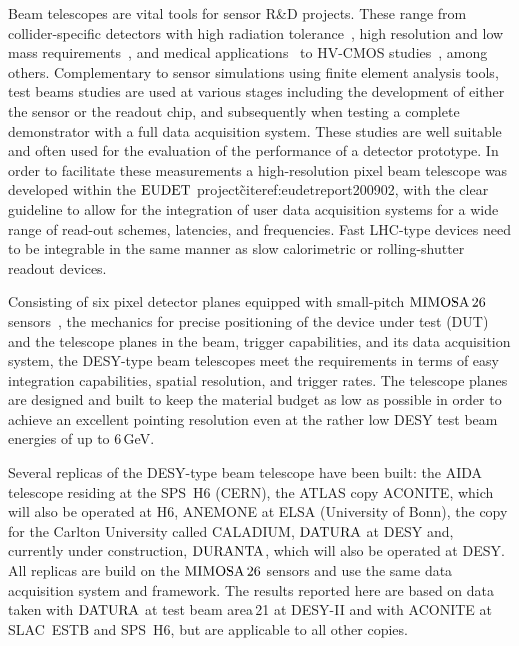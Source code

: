 

Beam telescopes are vital tools for sensor R\&D projects. 
These range from collider-specific detectors with high radiation tolerance~\cite{1748-0221-9-12-C12001,1748-0221-9-12-C12029},
 high resolution and low mass requirements~\cite{1748-0221-10-03-C03044}, and medical applications~\cite{Ballabriga2011S15} to HV-CMOS studies~\cite{1748-0221-7-08-C08002}, among others.
Complementary to sensor simulations using finite element analysis tools, test beams studies are used at various stages including the development of either the sensor or the readout chip,
 and subsequently when testing a complete demonstrator with a full data acquisition system. 
These studies are well suitable and often used for the evaluation of the performance of a detector prototype. %
In order to facilitate these measurements a high-resolution pixel beam telescope was developed within the $\textrm{EUDET}$ project\~cite{ref:eudetreport200902},
 with the clear guideline to allow for the integration of user data acquisition systems for a wide range of read-out schemes, latencies, and frequencies. 
Fast LHC-type devices need to be integrable in the same manner as slow calorimetric or rolling-shutter readout devices. 

Consisting of six pixel detector planes equipped with small-pitch $\textrm{MIMOSA\,26}$ sensors~\cite{HuGuo2010480},
 the mechanics for precise positioning of the device under test (DUT) and the telescope planes in the beam, trigger capabilities, and its data acquisition system, 
 the DESY-type beam telescopes meet the requirements in terms of easy integration capabilities, spatial resolution, and trigger rates. 
The telescope planes are designed and built to keep the material budget as low as possible in order to achieve an excellent pointing resolution
 even at the rather low DESY test beam energies of up to 6\,GeV.

Several replicas of the DESY-type beam telescope have been built:
 the AIDA telescope residing at the SPS~H6 (CERN), the ATLAS copy ACONITE, which will also be operated at H6, ANEMONE at ELSA (University of Bonn), the copy for the Carlton University called CALADIUM, 
 $\textrm{DATURA}$ at DESY and, currently under construction, $\textrm{DURANTA}$, which will also be operated at DESY. 
All replicas are build on the $\textrm{MIMOSA\,26}$ sensors and use the same data acquisition system and framework. 
The results reported here are based on data taken with $\textrm{DATURA}$ at test beam area\,21 at {DESY-II} and with ACONITE at SLAC~ESTB and SPS~H6, but are applicable to all other copies. 

